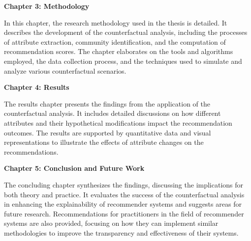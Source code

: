 \textbf{Chapter 3: Methodology}

In this chapter, the research methodology used in the thesis is detailed. It describes
the development of the counterfactual analysis, including the processes of
attribute extraction, community identification, and the computation of
recommendation scores. The chapter elaborates on the tools and algorithms employed,
the data collection process, and the techniques used to simulate and analyze various
counterfactual scenarios.

\textbf{Chapter 4: Results}

The results chapter presents the findings from the application of the counterfactual
analysis. It includes detailed discussions on how different attributes
and their hypothetical modifications impact the recommendation outcomes. The results
are supported by quantitative data and visual representations to illustrate the effects
of attribute changes on the recommendations.

\textbf{Chapter 5: Conclusion and Future Work}

The concluding chapter synthesizes the findings, discussing the implications for
both theory and practice. It evaluates the success of the counterfactual analysis
in enhancing the explainability of recommender systems and suggests areas for future
research. Recommendations for practitioners in the field of recommender systems
are also provided, focusing on how they can implement similar methodologies to improve
the transparency and effectiveness of their systems.